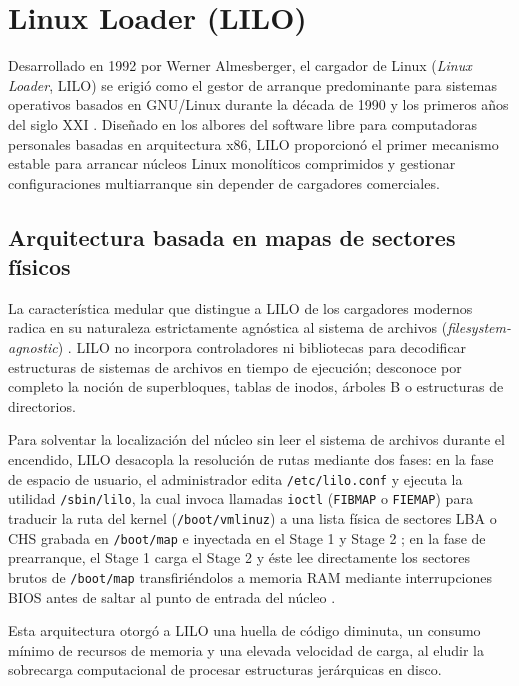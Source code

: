\documentclass[12pt]{article}
\begin{document}
\section{Linux Loader (LILO)}
\label{sec:linuxLoaderLilo}

Desarrollado en 1992 por Werner Almesberger, el cargador de Linux (\textit{Linux Loader}, LILO) se erigió como el gestor de arranque predominante para sistemas operativos basados en GNU/Linux durante la década de 1990 y los primeros años del siglo XXI \parencite{almesberger2000lilo}. Diseñado en los albores del software libre para computadoras personales basadas en arquitectura x86, LILO proporcionó el primer mecanismo estable para arrancar núcleos Linux monolíticos comprimidos y gestionar configuraciones multiarranque sin depender de cargadores comerciales.

\subsection{Arquitectura basada en mapas de sectores físicos}
\label{subsec:arquitecturaMapasLilo}

La característica medular que distingue a LILO de los cargadores modernos radica en su naturaleza estrictamente agnóstica al sistema de archivos (\textit{filesystem-agnostic}) \parencite{almesberger2000lilo}. LILO no incorpora controladores ni bibliotecas para decodificar estructuras de sistemas de archivos en tiempo de ejecución; desconoce por completo la noción de superbloques, tablas de inodos, árboles B o estructuras de directorios.

Para solventar la localización del núcleo sin leer el sistema de archivos durante el encendido, LILO desacopla la resolución de rutas mediante dos fases: en la fase de espacio de usuario, el administrador edita \texttt{/etc/lilo.conf} y ejecuta la utilidad \texttt{/sbin/lilo}, la cual invoca llamadas \texttt{ioctl} (\texttt{FIBMAP} o \texttt{FIEMAP}) para traducir la ruta del kernel (\texttt{/boot/vmlinuz}) a una lista física de sectores LBA o CHS grabada en \texttt{/boot/map} e inyectada en el Stage 1 y Stage 2 \parencite[\S 2.4, p.\ 64]{silberschatz2006fundamentos}; en la fase de prearranque, el Stage 1 carga el Stage 2 y éste lee directamente los sectores brutos de \texttt{/boot/map} transfiriéndolos a memoria RAM mediante interrupciones BIOS antes de saltar al punto de entrada del núcleo \parencite{almesberger2000lilo}.

Esta arquitectura otorgó a LILO una huella de código diminuta, un consumo mínimo de recursos de memoria y una elevada velocidad de carga, al eludir la sobrecarga computacional de procesar estructuras jerárquicas en disco.
\end{document}
